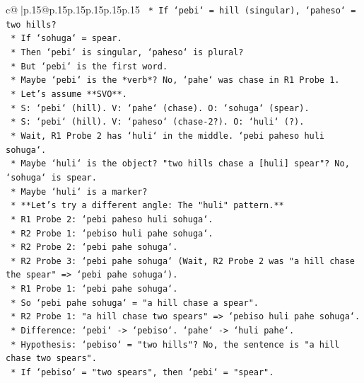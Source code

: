 \documentclass{article}
\begin{document}
{\begin{supertabular}{c@{$\;$}|p{.15\linewidth}@{}p{.15\linewidth}p{.15\linewidth}p{.15\linewidth}p{.15\linewidth}p{.15\linewidth}}
{{{\texttt{            *   If `pebi` = hill (singular), `paheso` = two hills?} \\
\texttt{            *   If `sohuga` = spear.} \\
\texttt{            *   Then `pebi` is singular, `paheso` is plural?} \\
\texttt{            *   But `pebi` is the first word.} \\
\texttt{            *   Maybe `pebi` is the *verb*? No, `pahe` was chase in R1 Probe 1.} \\
\texttt{            *   Let's assume **SVO**.} \\
\texttt{                *   S: `pebi` (hill). V: `pahe` (chase). O: `sohuga` (spear).} \\
\texttt{                *   S: `pebi` (hill). V: `paheso` (chase{-}2?). O: `huli` (?).} \\
\texttt{                *   Wait, R1 Probe 2 has `huli` in the middle. `pebi paheso huli sohuga`.} \\
\texttt{                *   Maybe `huli` is the object? "two hills chase a {[}huli{]} spear"? No, `sohuga` is spear.} \\
\texttt{                *   Maybe `huli` is a marker?} \\
\texttt{    *   **Let's try a different angle: The "huli" pattern.**} \\
\texttt{        *   R1 Probe 2: `pebi paheso huli sohuga`.} \\
\texttt{        *   R2 Probe 1: `pebiso huli pahe sohuga`.} \\
\texttt{        *   R2 Probe 2: `pebi pahe sohuga`.} \\
\texttt{        *   R2 Probe 3: `pebi pahe sohuga` (Wait, R2 Probe 2 was "a hill chase the spear" => `pebi pahe sohuga`).} \\
\texttt{        *   R1 Probe 1: `pebi pahe sohuga`.} \\
\texttt{        *   So `pebi pahe sohuga` = "a hill chase a spear".} \\
\texttt{        *   R2 Probe 1: "a hill chase two spears" => `pebiso huli pahe sohuga`.} \\
\texttt{            *   Difference: `pebi` {-}> `pebiso`. `pahe` {-}> `huli pahe`.} \\
\texttt{            *   Hypothesis: `pebiso` = "two hills"? No, the sentence is "a hill chase two spears".} \\
\texttt{            *   If `pebiso` = "two spears", then `pebi` = "spear".} \\
}}}
\end{supertabular}}
\end{document}
